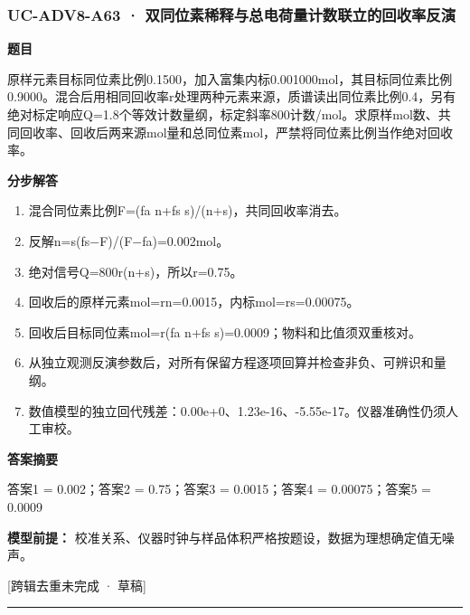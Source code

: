 \documentclass[UTF8,11pt,a4paper]{ctexart}
\begin{document}
\subsubsection*{UC-ADV8-A63 · 双同位素稀释与总电荷量计数联立的回收率反演}
\noindent\textbf{题目}\par
原样元素目标同位素比例0.1500，加入富集内标0.001000mol，其目标同位素比例0.9000。混合后用相同回收率r处理两种元素来源，质谱读出同位素比例0.4，另有绝对标定响应Q=1.8个等效计数量纲，标定斜率800计数/mol。求原样mol数、共同回收率、回收后两来源mol量和总同位素mol，严禁将同位素比例当作绝对回收率。\par
\medskip\noindent\textbf{分步解答}
\begin{enumerate}
\item 混合同位素比例F=(fa n+fs s)/(n+s)，共同回收率消去。
\item 反解n=s(fs−F)/(F−fa)=0.002mol。
\item 绝对信号Q=800r(n+s)，所以r=0.75。
\item 回收后的原样元素mol=rn=0.0015，内标mol=rs=0.00075。
\item 回收后目标同位素mol=r(fa n+fs s)=0.0009；物料和比值须双重核对。
\item 从独立观测反演参数后，对所有保留方程逐项回算并检查非负、可辨识和量纲。
\item 数值模型的独立回代残差：0.00e+0、1.23e-16、-5.55e-17。仪器准确性仍须人工审校。
\end{enumerate}
\noindent\textbf{答案摘要}\par
答案1 = 0.002；答案2 = 0.75；答案3 = 0.0015；答案4 = 0.00075；答案5 = 0.0009\par
\noindent\textbf{模型前提：}
校准关系、仪器时钟与样品体积严格按题设，数据为理想确定值无噪声。\par
\noindent\textcolor{red!65!black}{[跨辑去重未完成 · 草稿]} \par
\medskip\hrule\medskip
{}
\end{document}
